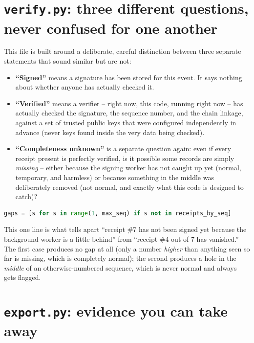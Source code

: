 \documentclass[11pt]{report}
\newcommand{\file}[1]{\texttt{#1}}
\begin{document}
\section{\file{verify.py}: three different questions, never confused for one another}

This file is built around a deliberate, careful distinction between three
separate statements that sound similar but are not:

\begin{itemize}[leftmargin=2em]
  \item \textbf{``Signed''} means a signature has been stored for this
        event. It says nothing about whether anyone has actually checked
        it.
  \item \textbf{``Verified''} means a verifier -- right now, this code,
        running right now -- has actually checked the signature, the
        sequence number, and the chain linkage, against a set of trusted
        public keys that were configured independently in advance (never
        keys found inside the very data being checked).
  \item \textbf{``Completeness unknown''} is a separate question again:
        even if every receipt present is perfectly verified, is it
        possible some records are simply \emph{missing} -- either because
        the signing worker has not caught up yet (normal, temporary, and
        harmless) or because something in the middle was deliberately
        removed (not normal, and exactly what this code is designed to
        catch)?
\end{itemize}

\begin{lstlisting}[language=Python]
gaps = [s for s in range(1, max_seq) if s not in receipts_by_seq]
\end{lstlisting}

This one line is what tells apart ``receipt \#7 has not been signed yet
because the background worker is a little behind'' from ``receipt \#4 out
of 7 has vanished.'' The first case produces no gap at all (only a
number \emph{higher} than anything seen so far is missing, which is
completely normal); the second produces a hole in the \emph{middle} of
an otherwise-numbered sequence, which is never normal and always gets
flagged.

\section{\file{export.py}: evidence you can take away}
\end{document}
